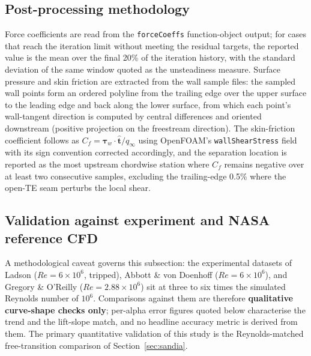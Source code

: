 \documentclass[11pt,a4paper]{article}
\begin{document}
\subsection{Post-processing methodology}
Force coefficients are read from the \texttt{forceCoeffs} function-object output; for cases that reach the iteration limit without meeting the residual targets, the reported value is the mean over the final 20\% of the iteration history, with the standard deviation of the same window quoted as the unsteadiness measure. Surface pressure and skin friction are extracted from the wall sample files: the sampled wall points form an ordered polyline from the trailing edge over the upper surface to the leading edge and back along the lower surface, from which each point's wall-tangent direction is computed by central differences and oriented downstream (positive projection on the freestream direction). The skin-friction coefficient follows as $C_f = \boldsymbol{\tau}_w \cdot \hat{\mathbf{t}} / q_\infty$ using OpenFOAM's \texttt{wallShearStress} field with its sign convention corrected accordingly, and the separation location is reported as the most upstream chordwise station where $C_f$ remains negative over at least two consecutive samples, excluding the trailing-edge 0.5\% where the open-TE seam perturbs the local shear.

\subsection{Validation against experiment and NASA reference CFD}\label{sec:validation}

A methodological caveat governs this subsection: the experimental datasets of Ladson ($Re = 6\times10^6$, tripped), Abbott \& von Doenhoff ($Re = 6\times10^6$), and Gregory \& O'Reilly ($Re = 2.88\times10^6$) sit at three to six times the simulated Reynolds number of $10^6$. Comparisons against them are therefore \textbf{qualitative curve-shape checks only}; per-alpha error figures quoted below characterise the trend and the lift-slope match, and no headline accuracy metric is derived from them. The primary quantitative validation of this study is the Reynolds-matched free-transition comparison of Section~\ref{sec:sandia}.
\end{document}
